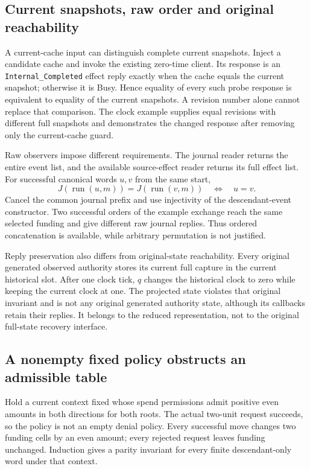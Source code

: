 \documentclass[10pt,a4paper]{article}
\newcommand{\code}[1]{\nolinkurl{#1}}
\begin{document}
\subsection{Current snapshots, raw order and original reachability}
A current-cache input can distinguish complete current snapshots. Inject a
candidate cache and invoke the existing zero-time client. Its response is
an \code{Internal_Completed} effect reply exactly when the cache equals the current snapshot;
otherwise it is Busy. Hence equality of every such probe response is
equivalent to equality of the current snapshots. A revision number alone
cannot replace that comparison. The clock example supplies equal revisions
with different full snapshots and demonstrates the changed response after
removing only the current-cache guard.

Raw observers impose different requirements. The journal reader returns the
entire event list, and the available source-effect reader returns its full
effect list. For successful canonical words $u,v$ from the same start,
\[
 J(\operatorname{run}(u,m))=J(\operatorname{run}(v,m))\quad\Longleftrightarrow\quad u=v.
\]
Cancel the common journal prefix and use injectivity of the descendant-event
constructor. Two successful orders of the example exchange reach the same
selected funding and give different raw journal replies. Thus ordered
concatenation is available, while arbitrary permutation is not justified.

Reply preservation also differs from original-state reachability. Every
original generated observed authority stores its current full capture in the
current historical slot. After one clock tick, $q$ changes the historical
clock to zero while keeping the current clock at one. The projected state
violates that original invariant and is not any original generated authority
state, although its callbacks retain their replies. It belongs to the reduced
representation, not to the original full-state recovery interface.

\subsection{A nonempty fixed policy obstructs an admissible table}
Hold a current context fixed whose spend permissions admit positive even
amounts in both directions for both roots. The actual two-unit request
succeeds, so the policy is not an empty denial policy. Every successful move
changes two funding cells by an even amount; every rejected request leaves
funding unchanged. Induction gives a parity invariant for every finite
descendant-only word under that context.
\end{document}
